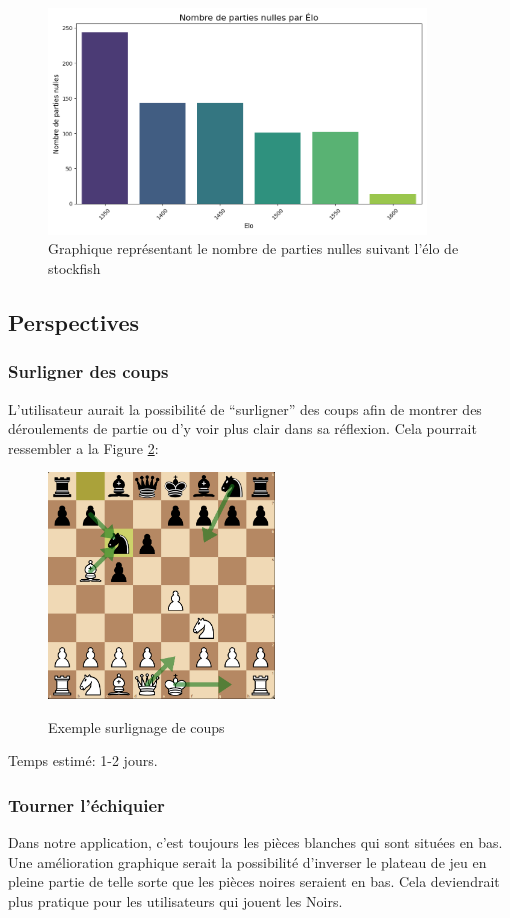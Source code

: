 \documentclass{article}
\begin{document}
\begin{figure}[h]
    \centering
    \includegraphics[width=\textwidth,height=6.0cm,keepaspectratio]{drawRate.png}
    \caption{Graphique représentant le nombre de parties nulles suivant l'élo de stockfish}
    \label{drawCountCmp}
\end{figure}
\FloatBarrier



\subsection{Perspectives}
\subsubsection{Surligner des coups}
L'utilisateur aurait la possibilité de ``surligner'' des coups afin de montrer des déroulements de partie ou d'y voir plus clair dans sa réflexion.
Cela pourrait ressembler a la Figure \ref{surlignage}:
\begin{figure}[h]
    \caption{Exemple surlignage de coups}
    \centering
    \includegraphics[width=\textwidth,height=6.0cm,keepaspectratio]{surlignage-coups}
    \label{surlignage}
\end{figure}
\FloatBarrier

Temps estimé: 1-2 jours.

\subsubsection{Tourner l'échiquier}
Dans notre application, c'est toujours les pièces blanches qui sont situées en bas. Une amélioration graphique serait la possibilité d'inverser le plateau
de jeu en pleine partie de telle sorte que les pièces noires seraient en bas. Cela deviendrait plus pratique pour les utilisateurs qui jouent les Noirs.
\end{document}
